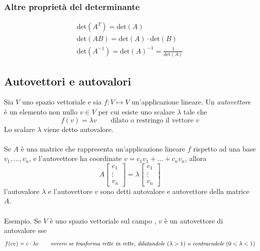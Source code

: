 \documentclass[italian]{article}
\newcommand{\ins}[1]{\text{$\mathbb{#1}$}}
\renewcommand{\det}[1]{\text{det$\left(#1\right)$}}
\begin{document}
\subsubsection{Altre proprietà del determinante}
\begin{gather*}
	\det{A^T} = \det{A} \\
	\det{AB} = \det{A} \cdot \det{B}\\
	\det{A^{-1}} =\det{A}^{-1} = \frac{1}{\det{A}} 
\end{gather*}

\newpage
\subsection{Autovettori e autovalori}
Sia $V$ uno spazio vettoriale e sia $f: V \longmapsto V$ un'applicazione lineare. Un \textit{autovettore} è un elemento non nullo $v \in V$ per cui esiste uno scalare $\lambda$ tale che
\[
	f(v) = \lambda v \qquad \text{dilato o restringo il vettore }v
\]
Lo scalare $\lambda$ viene detto autovalore.\\\\
Se $A$ è una matrice che rappresenta un'applicazione lineare $f$ rispetto ad una base $v_1,...,v_n$, e l'autovettore ha coordinate $v = c_1v_1 + ... + c_nv_n$, allora
\[
	A
	\begin{bmatrix}
		c_1 \\ \vdots \\ v_n
	\end{bmatrix}
	= 
	\lambda
	\begin{bmatrix}
		c_1 \\ \vdots \\ c_n
	\end{bmatrix}
\]
l'autovalore $\lambda$ e l'autovettore $v$ sono detti autovalore e autovettore della matrice $A$.\\\\
Esempio. Se $V$ è uno spazio vettoriale sul campo \ins{R}, $v$ è un autovettore di autovalore sse
\begin{gather*}
	f(cv) = c\cdot \lambda v \qquad \textit{ovvero se trasforma rette in rette, dilatandole $(\lambda > 1)$ o contraendole $ (0 <\lambda < 1)$}
\end{gather*}
\end{document}

